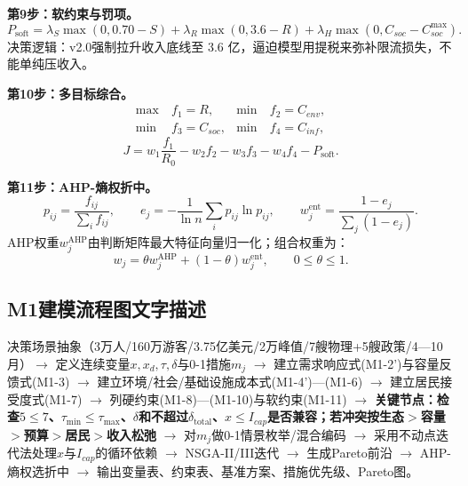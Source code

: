 \documentclass[UTF8,a4paper,12pt]{ctexart}
\begin{document}
\textbf{第9步：软约束与罚项。}
\begin{equation}\tag{M1-11}
P_{\mathrm{soft}}=\lambda_S\max(0,0.70-S)+\lambda_R\max(0,3.6-R)+\lambda_H\max(0,C_{soc}-C_{soc}^{\max}).
\end{equation}
决策逻辑：v2.0强制拉升收入底线至 3.6 亿，逼迫模型用提税来弥补限流损失，不能单纯压收入。

\textbf{第10步：多目标综合。}
\begin{equation}\tag{M1-12}
\begin{aligned}
\max&\ f_1=R, & \min&\ f_2=C_{env},\\
\min&\ f_3=C_{soc}, & \min&\ f_4=C_{inf},
\end{aligned}
\end{equation}
\begin{equation}\tag{M1-13}
J=w_1\frac{f_1}{R_0}-w_2f_2-w_3f_3-w_4f_4-P_{\mathrm{soft}}.
\end{equation}

\textbf{第11步：AHP-熵权折中。}
\begin{equation}\tag{M1-14}
p_{ij}=\frac{f_{ij}}{\sum_i f_{ij}},\qquad
e_j=-\frac{1}{\ln n}\sum_i p_{ij}\ln p_{ij},\qquad
w_j^{\mathrm{ent}}=\frac{1-e_j}{\sum_j(1-e_j)}.
\end{equation}
AHP权重\(w_j^{\mathrm{AHP}}\)由判断矩阵最大特征向量归一化；组合权重为：
\begin{equation}\tag{M1-15}
w_j=\theta w_j^{\mathrm{AHP}}+(1-\theta)w_j^{\mathrm{ent}},\qquad 0\le\theta\le1.
\end{equation}

\subsection{M1建模流程图文字描述}

决策场景抽象（3万人/160万游客/3.75亿美元/2万峰值/7艘物理+5艘政策/4—10月）\(\rightarrow\) 定义连续变量\(x,x_d,\tau,\delta\)与0-1措施\(m_j\) \(\rightarrow\) 建立需求响应式(M1-2')与容量反馈式(M1-3) \(\rightarrow\) 建立环境/社会/基础设施成本式(M1-4')—(M1-6) \(\rightarrow\) 建立居民接受度式(M1-7) \(\rightarrow\) 列硬约束(M1-8)—(M1-10)与软约束(M1-11) \(\rightarrow\) \textbf{关键节点：检查\(5\le7\)、\(\tau_{\min}\le\tau_{\max}\)、\(\delta\)和不超过\(\delta_{\mathrm{total}}\)、\(x\le I_{cap}\)是否兼容；若冲突按生态\(>\)容量\(>\)预算\(>\)居民\(>\)收入松弛} \(\rightarrow\) 对\(m_j\)做0-1情景枚举/混合编码 \(\rightarrow\) 采用不动点迭代法处理\(x\)与\(I_{cap}\)的循环依赖 \(\rightarrow\) NSGA-II/III迭代 \(\rightarrow\) 生成Pareto前沿 \(\rightarrow\) AHP-熵权选折中 \(\rightarrow\) 输出变量表、约束表、基准方案、措施优先级、Pareto图。
\end{document}
